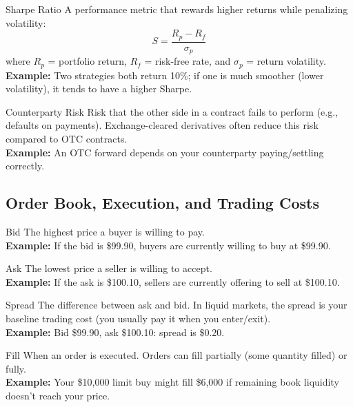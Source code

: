 \begin{keyterm}{Sharpe Ratio}
A performance metric that rewards higher returns while penalizing volatility:
\[
S = \frac{R_p - R_f}{\sigma_p}
\]
where $R_p$ = portfolio return, $R_f$ = risk-free rate, and $\sigma_p$ = return volatility.
\\\textbf{Example:} Two strategies both return 10\%; if one is much smoother (lower volatility),
it tends to have a higher Sharpe.
\end{keyterm}

\begin{keyterm}{Counterparty Risk}
Risk that the other side in a contract fails to perform (e.g., defaults on payments).
Exchange-cleared derivatives often reduce this risk compared to OTC contracts.
\\\textbf{Example:} An OTC forward depends on your counterparty paying/settling correctly.
\end{keyterm}

\subsection{Order Book, Execution, and Trading Costs}

\begin{keyterm}{Bid}
The highest price a buyer is willing to pay.
\\\textbf{Example:} If the bid is \$99.90, buyers are currently willing to buy at \$99.90.
\end{keyterm}

\begin{keyterm}{Ask}
The lowest price a seller is willing to accept.
\\\textbf{Example:} If the ask is \$100.10, sellers are currently offering to sell at \$100.10.
\end{keyterm}

\begin{keyterm}{Spread}
The difference between ask and bid. In liquid markets, the spread is your baseline trading
cost (you usually pay it when you enter/exit).
\\\textbf{Example:} Bid \$99.90, ask \$100.10: spread is \$0.20.
\end{keyterm}

\begin{keyterm}{Fill}
When an order is executed. Orders can fill partially (some quantity filled) or fully.
\\\textbf{Example:} Your \$10{,}000 limit buy might fill \$6{,}000 if remaining book liquidity
doesn't reach your price.
\end{keyterm}

